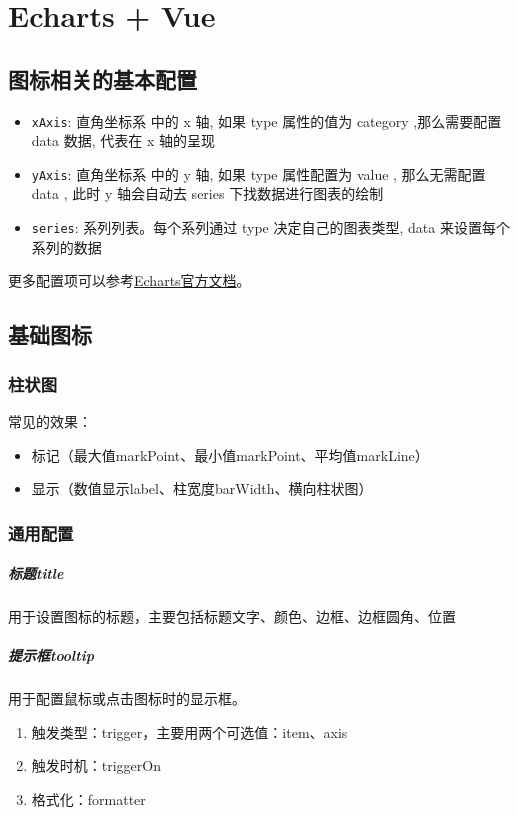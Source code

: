 \chapter{Echarts + Vue}
\section{图标相关的基本配置}
\begin{itemize}
    \item \verb|xAxis|: 直角坐标系 中的 x 轴, 如果 type 属性的值为 category ,那么需要配置 data 数据, 代表在 x 轴的呈现
    \item \verb|yAxis|: 直角坐标系 中的 y 轴, 如果 type 属性配置为 value , 那么无需配置 data , 此时 y 轴会自动去 series 下找数据进行图表的绘制
    \item \verb|series|: 系列列表。每个系列通过 type 决定自己的图表类型, data 来设置每个系列的数据
\end{itemize}

更多配置项可以参考\href{https://echarts.apache.org/zh/option.html#title}{Echarts官方文档}。

\section{基础图标}
\subsection{柱状图}
常见的效果：
\begin{itemize}
    \item 标记（最大值markPoint、最小值markPoint、平均值markLine）
    \item 显示（数值显示label、柱宽度barWidth、横向柱状图）
\end{itemize}
\subsection{通用配置}
\paragraph{标题title} 用于设置图标的标题，主要包括标题文字、颜色、边框、边框圆角、位置
\paragraph{提示框tooltip} 用于配置鼠标或点击图标时的显示框。
\begin{enumerate}
    \item 触发类型：trigger，主要用两个可选值：item、axis
    \item 触发时机：triggerOn
    \item 格式化：formatter
\end{enumerate}
